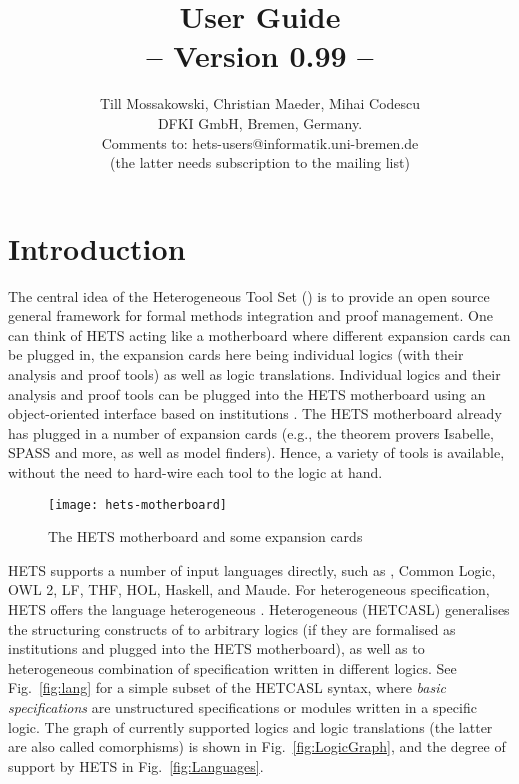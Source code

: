 \documentclass{article}
\newcommand{\normalTEXTSC}[2]{{#1\scriptsize#2}}
\newcommand{\LARGETEXTSC} [2]{{\LARGE     #1\large     #2}}
\newcommand     {\Hets}{\normalTEXTSC{H}{ETS}\xspace}
\newcommand{\LARGEHets} {\LARGETEXTSC{H}{ETS}\xspace}
\newcommand{\HetCASL}{\normalTEXTSC{H}{ET}\normalTEXTSC{C}{ASL}\xspace}
\begin{document}
\title{{\bf \protect{\LARGEHets} User Guide}\\
-- Version 0.99 --}
\author{Till Mossakowski, Christian Maeder,
  Mihai Codescu\\[1em]
DFKI GmbH, Bremen, Germany.\\[1em]
Comments to: hets-users@informatik.uni-bremen.de \\
(the latter needs subscription to the mailing list)
}

\maketitle

\section{Introduction}



The central idea of the Heterogeneous Tool Set (\protect\Hets) is to
provide an open source general framework for formal methods
integration and proof management. One can think of \Hets acting like a
motherboard where different expansion cards can be plugged in, the
expansion cards here being individual logics (with their analysis and
proof tools) as well as logic translations.  Individual logics and
their analysis and proof tools can be plugged into the \Hets
motherboard using an object-oriented interface based on institutions
\cite{GoguenBurstall92}.  The \Hets motherboard already has plugged in
a number of expansion cards (e.g., the theorem provers Isabelle, SPASS
and more, as well as model finders). Hence, a variety of tools is
available, without the need to hard-wire each tool to the logic at
hand.
\begin{figure}
\begin{center}
  \texttt{[image: hets-motherboard]}
\end{center}
\caption{The \Hets motherboard and some expansion cards}
\end{figure}

\Hets supports a number of input languages directly, such as \CASL,
Common Logic, OWL 2, LF, THF, HOL, Haskell, and Maude. For heterogeneous
specification, \Hets offers the language heterogeneous \CASL.
Heterogeneous \CASL (\HetCASL) generalises the structuring
constructs of
\CASL \cite{CASL-UM,CASL/RefManual} to arbitrary logics
(if they are formalised as institutions and plugged into
the \Hets motherboard), as well as to heterogeneous
combination of specification written in different logics.
See
Fig.~\ref{fig:lang} for a simple subset of the
\HetCASL syntax, where \emph{basic specifications} are unstructured
specifications or modules written in a specific logic.  The graph of
currently supported logics and logic translations (the latter are also
called comorphisms) is shown in Fig.~\ref{fig:LogicGraph}, and the
degree of support by \Hets in Fig.~\ref{fig:Languages}.
\end{document}

